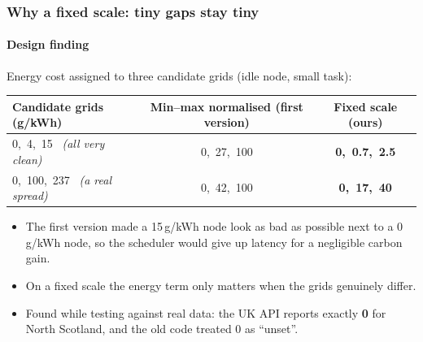 \documentclass[aspectratio=169,11pt]{beamer}
\begin{document}
\begin{frame}[t]
\frametitle{Why a fixed scale: tiny gaps stay tiny}
\framesubtitle{Design finding}
\small
Energy cost assigned to three candidate grids (idle node, small task):
\begin{center}
\setlength{\tabcolsep}{7pt}
\begin{tabular}{@{}lcc@{}}
\toprule
Candidate grids (g/kWh) & Min--max normalised (first version) & Fixed scale (ours) \\
\midrule
0,\ 4,\ 15 \ \emph{(all very clean)} & 0,\ 27,\ 100 & \textbf{0,\ 0.7,\ 2.5} \\
0,\ 100,\ 237 \ \emph{(a real spread)} & 0,\ 42,\ 100 & \textbf{0,\ 17,\ 40} \\
\bottomrule
\end{tabular}
\end{center}
\begin{itemize}
\item The first version made a 15\,g/kWh node look as bad as possible next to a 0\,g/kWh node, so the scheduler would give up latency for a negligible carbon gain.
\item On a fixed scale the energy term only matters when the grids genuinely differ.
\item Found while testing against real data: the UK API reports exactly \textbf{0} for North Scotland, and the old code treated 0 as ``unset''.
\end{itemize}
\end{frame}
\end{document}
